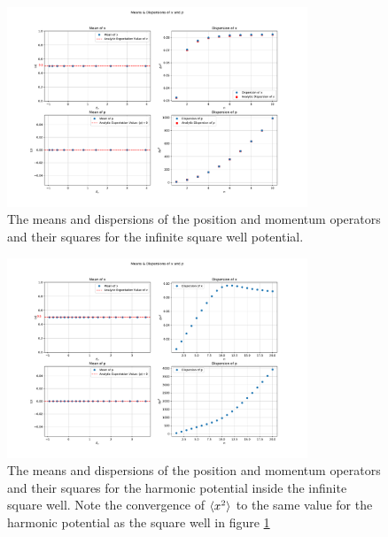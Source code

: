 \documentclass[10pt,a4paper]{article}
\theoremstyle{definition}
\theoremstyle{remark}
\begin{document}
\appendix
\begin{figure}
    \centering
    \includegraphics[width=0.8\textwidth]{means_and_dispersions_for_nu.pdf}
    \caption{\label{fig: means and dispersions for square well} The means and dispersions of the position and momentum operators and their squares for the infinite square well potential.}
\end{figure}
\begin{figure}
    \centering
    \includegraphics[width=0.8\textwidth]{means_and_dispersions_for_harmonic_nu.pdf}
    \caption{\label{fig: means and dispersions for harmonic potential} The means and dispersions of the position and momentum operators and their squares for the harmonic potential inside the infinite square well. Note the convergence of $\braket{x^2}$ to the same value for the harmonic potential as the square well in figure \ref{fig: means and dispersions for square well}}
\end{figure}


\end{document}
